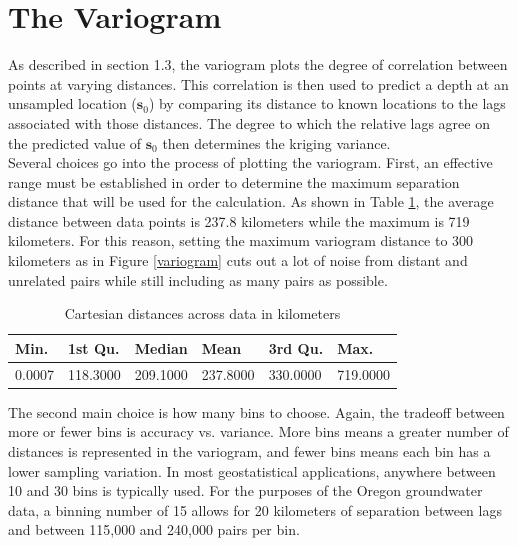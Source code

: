 \documentclass[12pt,twoside]{reedthesis}
\begin{document}
\section{The Variogram}


As described in section 1.3, the variogram plots the degree of correlation between points at varying distances. This correlation is then used to predict a depth at an unsampled location ($\mathbf{s}_0$) by comparing its distance to known locations to the lags associated with those distances. The degree to which the relative lags agree on the predicted value of $\mathbf{s}_0$ then determines the kriging variance. \\

Several choices go into the process of plotting the variogram. First, an effective range must be established in order to determine the maximum separation distance that will be used for the calculation. As shown in Table \ref{dists}, the average distance between data points is 237.8 kilometers while the maximum is 719 kilometers. For this reason, setting the maximum variogram distance to 300 kilometers as in Figure \ref{variogram} cuts out a lot of noise from distant and unrelated pairs while still including as many pairs as possible. 

\begin{table}[h!]

\centering

\begin{tabular}{l|l|l|l|l|l}

\hline
Min.  & 1st Qu.  & Median  &   Mean  & 3rd Qu.  &   Max. \\
\hline
  0.0007 & 118.3000 & 209.1000 & 237.8000 & 330.0000 & 719.0000 \\
\hline

\end{tabular}

\caption{Cartesian distances across data in kilometers}
\label{dists}

\end{table}
The second main choice is how many bins to choose. Again, the tradeoff between more or fewer bins is accuracy vs. variance. More bins means a greater number of distances is represented in the variogram, and fewer bins means each bin has a lower sampling variation. In most geostatistical applications, anywhere between 10 and 30 bins is typically used. For the purposes of the Oregon groundwater data, a binning number of 15 allows for 20 kilometers of separation between lags and between 115,000 and 240,000 pairs per bin. \\
\end{document}
